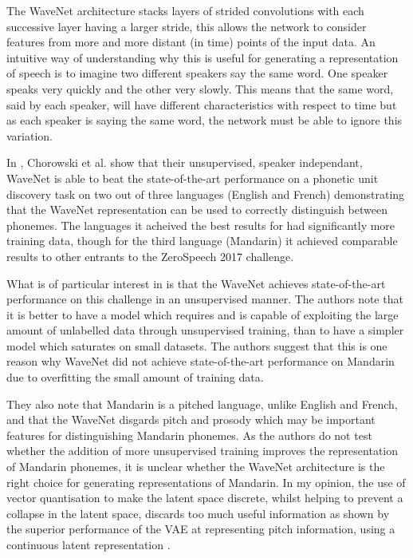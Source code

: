 The WaveNet architecture stacks layers of strided convolutions with each successive layer having a larger stride, this allows the network to consider features from more and more distant (in time) points of the input data. An intuitive way of understanding why this is useful for generating a representation of speech is to imagine two different speakers say the same word. One speaker speaks very quickly and the other very slowly. This means that the same word, said by each speaker, will have different characteristics with respect to time but as each speaker is saying the same word, the network must be able to ignore this variation.

In \cite{wavenet}, Chorowski et al. show that their unsupervised, speaker independant, WaveNet is able to beat the state-of-the-art performance on a phonetic unit discovery task \cite{dunbar2017zero} on two out of three languages (English and French) demonstrating that the WaveNet representation can be used to correctly distinguish between phonemes. The languages it acheived the best results for had significantly more training data, though for the third language (Mandarin) it achieved comparable results to other entrants to the ZeroSpeech 2017 challenge. 

What is of particular interest in \cite{wavenet} is that the WaveNet achieves state-of-the-art performance on this challenge in an unsupervised manner. The authors note that it is better to have a model which requires and is capable of exploiting the large amount of unlabelled data through unsupervised training, than to have a simpler model which saturates on small datasets. The authors suggest that this is one reason why WaveNet did not achieve state-of-the-art performance on Mandarin due to overfitting the small amount of training data.

They also note that Mandarin is a pitched language, unlike English and French, and that the WaveNet disgards pitch and prosody \cite{van2017neural} which may be important features for distinguishing Mandarin phonemes. As the authors do not test whether the addition of more unsupervised training improves the representation of Mandarin phonemes, it is unclear whether the WaveNet architecture is the right choice for generating representations of Mandarin. In my opinion, the use of vector quantisation to make the latent space discrete, whilst helping to prevent a collapse in the latent space, discards too much useful information as shown by the superior performance of the \ac{VAE} at representing pitch information, using a continuous latent representation \cite{wavenet}. 

